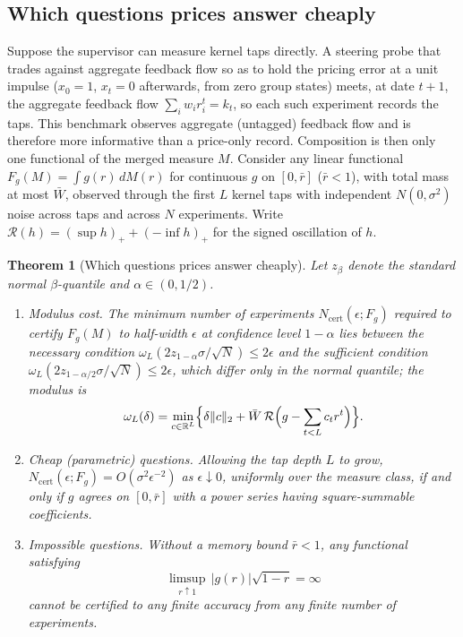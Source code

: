 \documentclass[11pt,letterpaper]{article}
\newtheorem{theorem}{Theorem}[section]
\theoremstyle{definition}
\newcommand{\R}{\mathbb{R}}
\begin{document}
\subsection{Which questions prices answer cheaply}

Suppose the supervisor can measure kernel taps directly. A steering probe that trades against aggregate feedback flow so as to hold the pricing error at a unit impulse ($x_0 = 1$, $x_t = 0$ afterwards, from zero group states) meets, at date $t + 1$, the aggregate feedback flow $\sum_i w_i r_i^t = k_t$, so each such experiment records the taps. This benchmark observes aggregate (untagged) feedback flow and is therefore more informative than a price-only record. Composition is then only one functional of the merged measure $M$. Consider any linear functional $F_g(M) = \int g(r)\, dM(r)$ for continuous $g$ on $[0, \bar{r}]$ ($\bar{r} < 1$), with total mass at most $\bar{W}$, observed through the first $L$ kernel taps with independent $N(0,\sigma^2)$ noise across taps and across $N$ experiments. Write $\mathcal{R}(h) = (\sup h)_+ + (-\inf h)_+$ for the signed oscillation of $h$.

\begin{theorem}[Which questions prices answer cheaply]\label{n:questions}
Let $z_\beta$ denote the standard normal $\beta$-quantile and $\alpha \in (0, 1/2)$.
\begin{enumerate}
  \item[(i)] \emph{Modulus cost.} The minimum number of experiments $N_{\mathrm{cert}}(\epsilon; F_g)$ required to certify $F_g(M)$ to half-width $\epsilon$ at confidence level $1-\alpha$ lies between the necessary condition $\omega_L(2z_{1-\alpha}\sigma/\sqrt N)\le2\epsilon$ and the sufficient condition $\omega_L(2z_{1-\alpha/2}\sigma/\sqrt N)\le2\epsilon$, which differ only in the normal quantile; the modulus is
  \[
    \omega_L(\delta) = \min_{c \in \R^L} \Bigl\{ \delta \|c\|_2 + \bar{W}\, \mathcal{R}\Bigl(g - \sum_{t < L} c_t r^t\Bigr) \Bigr\}.
  \]
  \item[(ii)] \emph{Cheap (parametric) questions.} Allowing the tap depth $L$ to grow, $N_{\mathrm{cert}}(\epsilon;F_g)=O(\sigma^2\epsilon^{-2})$ as $\epsilon\downarrow0$, uniformly over the measure class, if and only if $g$ agrees on $[0, \bar{r}]$ with a power series having square-summable coefficients.
  \item[(iii)] \emph{Impossible questions.} Without a memory bound $\bar{r} < 1$, any functional satisfying
  \[
    \limsup_{r \uparrow 1}\, |g(r)|\sqrt{1 - r} = \infty
  \]
  cannot be certified to any finite accuracy from any finite number of experiments.
\end{enumerate}
\end{theorem}
\end{document}
